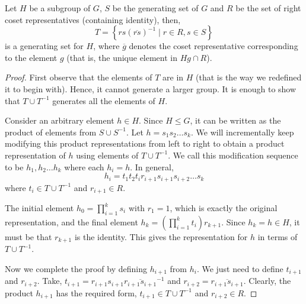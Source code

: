 \begin{lemma}
Let $H$ be a subgroup of $G$, $S$ be the generating set of $G$ and $R$ be the set of right coset representatives (containing identity), then,
$$T = \left\{ rs (\overline{rs})^{-1} \mid r \in R, s \in S \right\}$$
is a generating set for $H$, where $\overline{g}$ denotes the coset representative corresponding to the element $g$ (that is, the unique element in $Hg \cap R$).
\end{lemma}
\begin{proof}
First observe that the elements of $T$ are in $H$ (that is the way we redefined it to begin with). Hence, it cannot generate a larger group. It is enough to show that $T \cup T^{-1}$ generates all the elements of $H$.

Consider an arbitrary element $h \in H$. Since $H \le G$, it can be written as the product of elements from $S \cup S^{-1}$. Let $h = s_1s_2 \ldots s_k$. We will incrementally keep modifying this product representations from left to right to obtain a product representation of $h$ using elements of $T \cup T^{-1}$. We call this modification sequence to be $h_1, h_2 \ldots h_k$ where each $h_i = h$.
%
%
In general, $$h_i = t_1 t_2 t_i r_{i+1} s_{i+1} s_{i+2} \ldots s_k$$
where $t_i \in T \cup T^{-1}$ and $r_{i+1} \in R$.

The initial element $h_0 = \prod_{i=1}^k s_i$ with $r_1 = 1$, which is exactly the original representation, and the final element $h_k = (\prod_{i=1}^k t_i)r_{k+1}$. Since $h_k = h \in H$, it must be that $r_{k+1}$ is the identity. This gives the representation for $h$ in terms of $T \cup T^{-1}$.

Now we complete the proof by defining $h_{i+1}$ from $h_i$. We just need to define $t_{i+1}$ and $r_{i+2}$. Take, $t_{i+1} = r_{i+1}s_{i+1}\overline{r_{i+1}s_{i+1}}^{-1}$ and $r_{i+2} = \overline{r_{i+1}s_{i+1}}$. Clearly, the product $h_{i+1}$ has the required form, $t_{i+1} \in T \cup T^{-1}$ and $r_{i+2} \in R$.
\end{proof}


